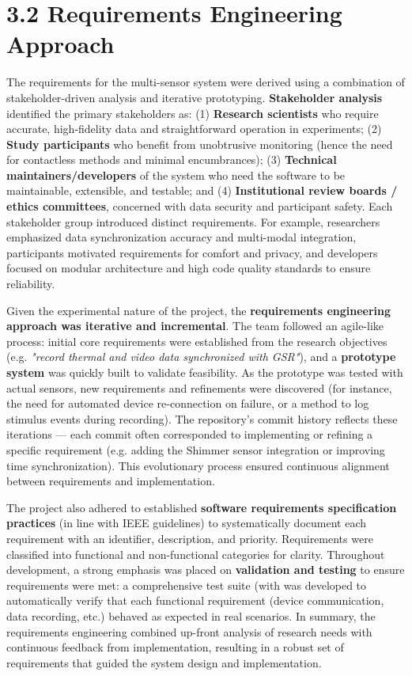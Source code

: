\section{3.2 Requirements Engineering Approach}

The requirements for the multi-sensor system were derived using a
combination of stakeholder-driven analysis and iterative prototyping.
\textbf{Stakeholder analysis} identified the primary stakeholders as: (1)
\textbf{Research scientists} who require accurate, high-fidelity data and
straightforward operation in experiments; (2) \textbf{Study participants} who
benefit from unobtrusive monitoring (hence the need for contactless
methods and minimal encumbrances); (3) \textbf{Technical
maintainers/developers} of the system who need the software to be
maintainable, extensible, and testable; and (4) \textbf{Institutional review
boards / ethics committees}, concerned with data security and
participant safety. Each stakeholder group introduced distinct
requirements. For example, researchers emphasized data synchronization
accuracy and multi-modal integration, participants motivated
requirements for comfort and privacy, and developers focused on modular
architecture and high code quality standards to ensure reliability.

Given the experimental nature of the project, the \textbf{requirements
engineering approach was iterative and incremental}. The team followed
an agile-like process: initial core requirements were established from
the research objectives (e.g. \textit{"record thermal and video data
synchronized with GSR"}), and a \textbf{prototype system} was quickly built
to validate feasibility. As the prototype was tested with actual
sensors, new requirements and refinements were discovered (for instance,
the need for automated device re-connection on failure, or a method to
log stimulus events during recording). The repository's commit history
reflects these iterations --- each commit often corresponded to
implementing or refining a specific requirement (e.g. adding the Shimmer
sensor integration or improving time synchronization). This evolutionary
process ensured continuous alignment between requirements and
implementation.

The project also adhered to established \textbf{software requirements
specification practices} (in line with IEEE guidelines) to
systematically document each requirement with an identifier,
description, and priority. Requirements were classified into functional
and non-functional categories for clarity. Throughout development, a
strong emphasis was placed on \textbf{validation and testing} to ensure
requirements were met: a comprehensive test suite (with %
was developed to automatically verify that each functional requirement
(device communication, data recording, etc.) behaved as expected in real
scenarios. In summary, the requirements engineering combined up-front
analysis of research needs with continuous feedback from implementation,
resulting in a robust set of requirements that guided the system design
and implementation.

